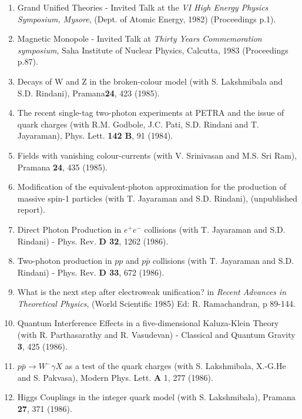 \begin{enumerate}
\item Grand Unified Theories - Invited Talk at the {\it VI High Energy
Physics Symposium, Mysore}, (Dept. of Atomic Energy, 1982) (Proceedings p.1).

\item Magnetic Monopole - Invited Talk at {\em Thirty Years
Commemoration symposium}, Saha Institute of Nuclear Physics, Calcutta,
1983 (Proceedings p.87).

\item Decays of W and Z in the broken-colour model (with S. Lakshmibala
and S.D. Rindani), Pramana{\bf 24}, 423 (1985).

\item The recent single-tag two-photon experiments at PETRA and the
issue of quark charges (with R.M. Godbole, J.C. Pati, S.D. Rindani and
T. Jayaraman), Phys. Lett. {\bf 142 B}, 91 (1984).

\item Fields with vanishing colour-currents (with V. Srinivasan and M.S.
Sri Ram), Pramana {\bf 24}, 435 (1985).
 
\item Modification of the equivalent-photon approximation for the
production of massive spin-1 particles (with T. Jayaraman and S.D.
Rindani), (unpublished report).

\item Direct Photon Production in $e^+ e^-$ collisions (with T.
Jayaraman and S.D. Rindani) - Phys. Rev. {\bf D 32}, 1262 (1986).

\item Two-photon production in $pp$ and $p\bar{p}$ collisions (with T.
Jayaraman and S.D. Rindani) - Phys. Rev. {\bf D 33}, 672 (1986).

\item What is the next step after electroweak unification? in {\em
Recent Advances in Theoretical Physics}, (World Scientific 1985) Ed: R.
Ramachandran, p 89-144.

\item Quantum Interference Effects in a five-dimensional Kaluza-Klein
Theory (with R. Parthasarathy and R. Vasudevan) - Classical and Quantum
Gravity {\bf 3}, 425 (1986).

\item $p\bar{p} \rightarrow W^- \gamma X$ as a test of the quark
charges (with S. Lakshmibala, X.-G.He and S. Pakvasa), Modern Phys.
Lett. {\bf A} 1, 277 (1986).

\item Higgs Couplings in the integer quark model (with S. Lakshmibala),
Pramana {\bf 27}, 371 (1986).


\end{enumerate}
